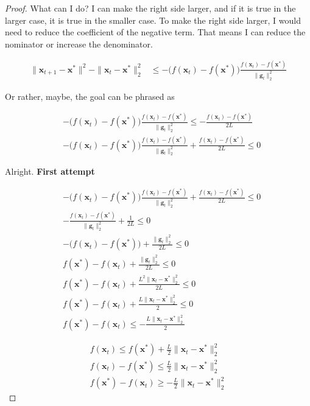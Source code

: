 \documentclass{article}
\begin{document}
\begin{proof}
	What can I do? I can make the right side larger, and if it is true in the larger case, it is true in the smaller case. To make the right side larger, I would need to reduce the coefficient of the negative term. That means I can reduce the nominator or increase  the denominator. 

	\begin{align}
		\|\mathbf{x}_{t+1} - \mathbf{x}^*\|^2 - \|\mathbf{x}_t - \mathbf{x}^*\|^2_2 &\le - \big( f(\mathbf{x}_t) - f(\mathbf{x}^*) \big) \frac{f(\mathbf{x}_t) - f(\mathbf{x}^*)}{\|\mathbf{g}_t\|^2_2}
	\end{align}

	Or rather, maybe, the goal can be phrased as
	
	\begin{align}
		&- \big( f(\mathbf{x}_t) - f(\mathbf{x}^*) \big) \frac{f(\mathbf{x}_t) - f(\mathbf{x}^*)}{\|\mathbf{g}_t\|^2_2} \le - \frac{f(\mathbf{x}_t) - f(\mathbf{x}^*)}{2L}\\
		&- \big( f(\mathbf{x}_t) - f(\mathbf{x}^*) \big) \frac{f(\mathbf{x}_t) - f(\mathbf{x}^*)}{\|\mathbf{g}_t\|^2_2} + \frac{f(\mathbf{x}_t) - f(\mathbf{x}^*)}{2L}\le 0
	\end{align}
	
	Alright. \textbf{First attempt}
	
	\begin{align}
		&- \big( f(\mathbf{x}_t) - f(\mathbf{x}^*) \big) \frac{f(\mathbf{x}_t) - f(\mathbf{x}^*)}{\|\mathbf{g}_t\|^2_2} + \frac{f(\mathbf{x}_t) - f(\mathbf{x}^*)}{2L}\le 0\\
		&-   \frac{f(\mathbf{x}_t) - f(\mathbf{x}^*)}{\|\mathbf{g}_t\|^2_2} + \frac{1}{2L}\le 0\\
		&-  \big(f(\mathbf{x}_t) - f(\mathbf{x}^*)\big) + \frac{\|\mathbf{g}_t\|^2_2}{2L}\le 0\\
		& f(\mathbf{x}^*) - f(\mathbf{x}_t) + \frac{\|\mathbf{g}_t\|^2_2}{2L}\le 0\\
	& f(\mathbf{x}^*) - f(\mathbf{x}_t) + \frac{L^2\|\mathbf{x}_t-\mathbf{x}^*\|^2_2}{2L}\le 0	\\
	& f(\mathbf{x}^*) - f(\mathbf{x}_t) + \frac{L\|\mathbf{x}_t-\mathbf{x}^*\|^2_2}{2}\le 0	\\
	& f(\mathbf{x}^*) - f(\mathbf{x}_t) \le - \frac{L\|\mathbf{x}_t-\mathbf{x}^*\|^2_2}{2}	
	\end{align}
	
	\begin{align}
		f(\mathbf{x}_t) \le f(\mathbf{x}^*) + \frac{L}{2}\|\mathbf{x}_t-\mathbf{x}^*\|^2_2\\
		f(\mathbf{x}_t) -  f(\mathbf{x}^*) \le  \frac{L}{2}\|\mathbf{x}_t-\mathbf{x}^*\|^2_2\\
		f(\mathbf{x}^*) - f(\mathbf{x}_t) \ge - \frac{L}{2}\|\mathbf{x}_t-\mathbf{x}^*\|^2_2
	\end{align}


\end{proof}
\end{document}

